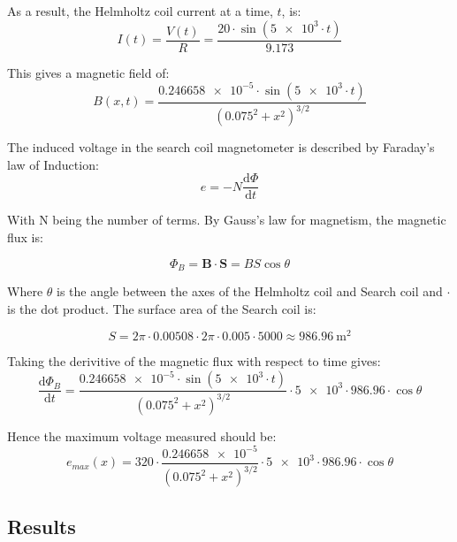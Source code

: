 As a result, the Helmholtz coil current at a time, $t$, is:
\begin{equation*}
    I \left( t \right) = \frac{V \left( t \right)}{R}=\frac{20 \cdot \sin \left(\num{5e3} \cdot t\right) }{9.173}
\end{equation*}

This gives a magnetic field of:
\begin{equation*}
    B \left( x,t \right) = \frac{\num{0.246658e-5} \cdot \sin \left( \num{5e3} \cdot t \right)}{\left( 0.075^2 + x^2 \right)^{3/2}}
\end{equation*}
 
The induced voltage in the search coil magnetometer is described by Faraday's law of Induction\cite{wiki:faraday}:
\begin{equation*}
    e = - N\frac{\mathrm d \Phi}{\mathrm dt}
\end{equation*}

With N being the number of terms.
By Gauss's law\cite{wiki:gauss} for magnetism, the magnetic flux is:

\begin{equation*}
    \Phi_B = \mathbf{B} \cdot \mathbf{S} = BS \cos \theta
\end{equation*}

Where $\theta$ is the angle between the axes of the Helmholtz coil and Search coil and $\cdot$ is the dot product.
The surface area of the Search coil is:

\begin{equation*}
    S = 2\pi \cdot 0.00508 \cdot 2\pi \cdot 0.005 \cdot 5000 \approx \SI{986.96}{\metre\squared}
\end{equation*}

Taking the derivitive of the magnetic flux with respect to time gives:
\begin{equation*}
    \frac{\mathrm d\Phi_B}{\mathrm dt} = \frac{\num{0.246658e-5} \cdot \sin \left( \num{5e3} \cdot t \right) }{\left( 0.075^2 + x^2 \right)^{3/2}} \cdot \num{5e3} \cdot 986.96 \cdot \cos \theta
\end{equation*}

Hence the maximum voltage measured should be:
\begin{equation*}
    e_{max} \left( x \right) = 320 \cdot \frac{\num{0.246658e-5} }{\left( 0.075^2 + x^2 \right)^{3/2}} \cdot \num{5e3} \cdot 986.96 \cdot \cos \theta
\end{equation*}

\subsection{Results}

